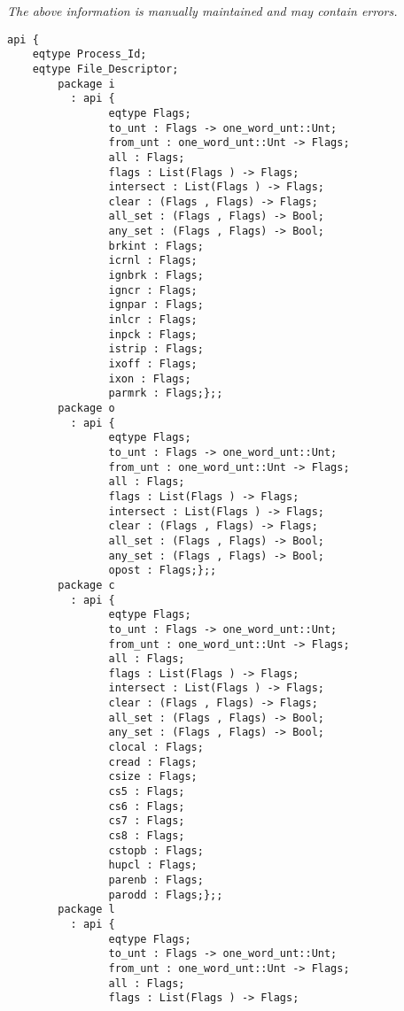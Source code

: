 \label{api:Posix\_Tty}

{\tiny \it The above information is manually maintained and may contain errors.}
\begin{verbatim}
api {
    eqtype Process_Id;
    eqtype File_Descriptor;
        package i
          : api {
                eqtype Flags;
                to_unt : Flags -> one_word_unt::Unt;
                from_unt : one_word_unt::Unt -> Flags;
                all : Flags;
                flags : List(Flags ) -> Flags;
                intersect : List(Flags ) -> Flags;
                clear : (Flags , Flags) -> Flags;
                all_set : (Flags , Flags) -> Bool;
                any_set : (Flags , Flags) -> Bool;
                brkint : Flags;
                icrnl : Flags;
                ignbrk : Flags;
                igncr : Flags;
                ignpar : Flags;
                inlcr : Flags;
                inpck : Flags;
                istrip : Flags;
                ixoff : Flags;
                ixon : Flags;
                parmrk : Flags;};;
        package o
          : api {
                eqtype Flags;
                to_unt : Flags -> one_word_unt::Unt;
                from_unt : one_word_unt::Unt -> Flags;
                all : Flags;
                flags : List(Flags ) -> Flags;
                intersect : List(Flags ) -> Flags;
                clear : (Flags , Flags) -> Flags;
                all_set : (Flags , Flags) -> Bool;
                any_set : (Flags , Flags) -> Bool;
                opost : Flags;};;
        package c
          : api {
                eqtype Flags;
                to_unt : Flags -> one_word_unt::Unt;
                from_unt : one_word_unt::Unt -> Flags;
                all : Flags;
                flags : List(Flags ) -> Flags;
                intersect : List(Flags ) -> Flags;
                clear : (Flags , Flags) -> Flags;
                all_set : (Flags , Flags) -> Bool;
                any_set : (Flags , Flags) -> Bool;
                clocal : Flags;
                cread : Flags;
                csize : Flags;
                cs5 : Flags;
                cs6 : Flags;
                cs7 : Flags;
                cs8 : Flags;
                cstopb : Flags;
                hupcl : Flags;
                parenb : Flags;
                parodd : Flags;};;
        package l
          : api {
                eqtype Flags;
                to_unt : Flags -> one_word_unt::Unt;
                from_unt : one_word_unt::Unt -> Flags;
                all : Flags;
                flags : List(Flags ) -> Flags;

\end{verbatim}
